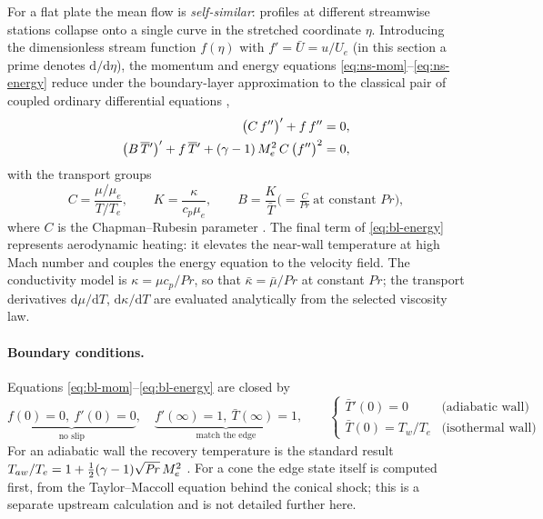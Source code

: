 \documentclass[11pt]{article}
\begin{document}
For a flat plate the mean flow is \emph{self-similar}: profiles at different streamwise stations collapse
onto a single curve in the stretched coordinate $\eta$. Introducing the dimensionless stream function
$f(\eta)$ with $f'=\bar U=u/U_e$ (in this section a prime denotes $\mathrm d/\mathrm d\eta$), the momentum
and energy equations \eqref{eq:ns-mom}--\eqref{eq:ns-energy} reduce under the boundary-layer approximation
to the classical pair of coupled ordinary differential equations
\cite{white2006,ozgen2008},
\begin{align}
  \big(C\,f''\big)' + f\,f'' &= 0, \label{eq:bl-mom}\\
  \big(B\,\overline{T}{}'\big)' + f\,\overline{T}{}' + (\gamma-1)\,M_e^2\,C\,\big(f''\big)^2 &= 0, \label{eq:bl-energy}
\end{align}
with the transport groups
\begin{equation}\label{eq:transport}
  C=\frac{\mu/\mu_e}{T/T_e},\qquad K=\frac{\kappa}{c_p\mu_e},\qquad
  B=\frac{K}{\bar T}\Big(=\tfrac{C}{\mathit{Pr}}\ \text{at constant }\mathit{Pr}\Big),
\end{equation}
where $C$ is the Chapman--Rubesin parameter \cite{chapman1949}. The final term of \eqref{eq:bl-energy}
represents aerodynamic heating: it elevates the near-wall temperature at high Mach number and couples the
energy equation to the velocity field. The conductivity model is $\kappa=\mu c_p/\mathit{Pr}$, so that
$\bar\kappa=\bar\mu/\mathit{Pr}$ at constant $\mathit{Pr}$; the transport derivatives
$\mathrm d\mu/\mathrm dT$, $\mathrm d\kappa/\mathrm dT$ are evaluated analytically from the selected
viscosity law.

\paragraph{Boundary conditions.} Equations \eqref{eq:bl-mom}--\eqref{eq:bl-energy} are closed by
\begin{equation}\label{eq:blbc}
  \underbrace{f(0)=0,\ f'(0)=0}_{\text{no slip}},\quad
  \underbrace{f'(\infty)=1,\ \bar T(\infty)=1}_{\text{match the edge}},\qquad
  \begin{cases}\bar T{}'(0)=0 &\text{(adiabatic wall)}\\ \bar T(0)=T_w/T_e &\text{(isothermal wall)}\end{cases}
\end{equation}
For an adiabatic wall the recovery temperature is the standard result
$T_{aw}/T_e=1+\tfrac12(\gamma-1)\sqrt{\mathit{Pr}}\,M_e^2$ \cite{white2006}. For a cone the edge state itself is computed
first, from the Taylor--Maccoll equation behind the conical shock; this is a separate upstream
calculation and is not detailed further here.
\end{document}
